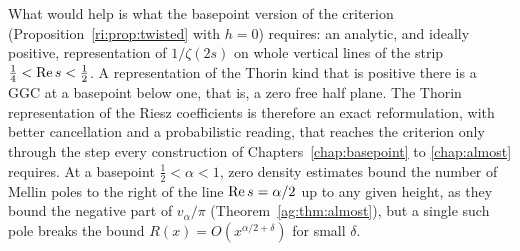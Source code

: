 What would help is what the basepoint version of the criterion (Proposition~\ref{ri:prop:twisted} with $h=0$) requires: an analytic, and ideally positive, representation of $1/\zeta(2s)$ on whole vertical lines of the strip $\frac14<\operatorname{Re} s<\frac12$. A representation of the Thorin kind that is positive there is a GGC at a basepoint below one, that is, a zero free half plane. The Thorin representation of the Riesz coefficients is therefore an exact reformulation, with better cancellation and a probabilistic reading, that reaches the criterion only through the step every construction of Chapters~\ref{chap:basepoint} to \ref{chap:almost} requires. At a basepoint $\frac12<\alpha<1$, zero density estimates bound the number of Mellin poles to the right of the line $\operatorname{Re} s=\alpha/2$ up to any given height, as they bound the negative part of $v_\alpha/\pi$ (Theorem~\ref{ag:thm:almost}), but a single such pole breaks the bound $R(x)=O(x^{\alpha/2+\delta})$ for small $\delta$.

